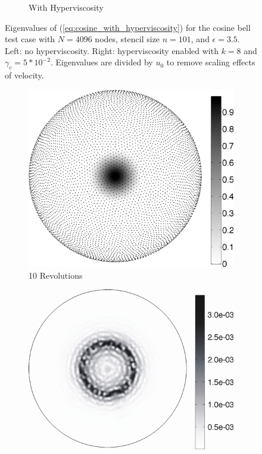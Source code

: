 \begin{figure}[ht!]
\begin{center}
\begin{subfigure}[b]{0.45\textwidth}
	\caption{With Hyperviscosity}
	\label{fig:cosine_eigs_hv}
\end{subfigure}
\caption{Eigenvalues of (\ref{eq:cosine_with_hyperviscosity}) for the cosine bell test case with $N=4096$ nodes, stencil size $n=101$, and $\epsilon = 3.5$. Left: no hyperviscosity. Right: hyperviscosity enabled with $k=8$ and $\gamma_c = 5*10^{-2}$. Eigenvalues are divided by $u_0$ to remove scaling effects of velocity.  
}
\label{fig:eig_cosine}
\end{center}
\end{figure}

\begin{figure}[ht!]
\begin{center}
\begin{subfigure}[b]{0.45\textwidth}
	\includegraphics[width=1.0\textwidth]{figures/paper1/figures/cosine_bell/trimmed_ComputedSolution_ManualBar.pdf}
	\caption{10 Revolutions}
	\label{fig:cosine_approx}
\end{subfigure}
\begin{subfigure}[b]{0.45\textwidth}
	\includegraphics[width=1.0\textwidth]{figures/paper1/figures/cosine_bell/trimmed_Error_CoveredScale2.pdf}

\end{subfigure}
\end{center}
\end{figure}
